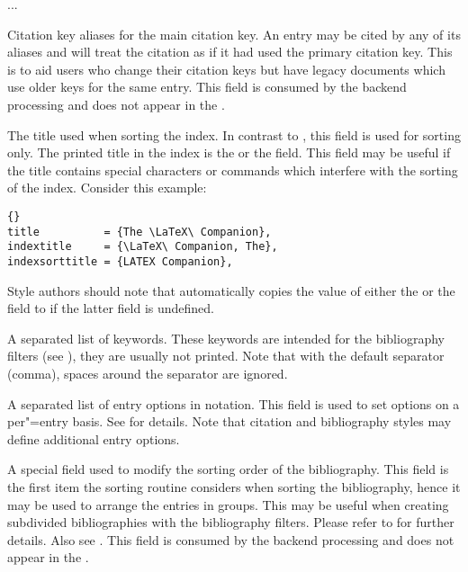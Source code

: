 \documentclass{ltxdockit}[2011/03/25]
\newcommand*{\biblatex}{\sty{biblatex}\xspace}
\begin{document}
\begin{fieldlist}
\begin{ltxexample}
\english[variant=british]
...
\endenglish
\end{ltxexample}
%


Citation key aliases for the main citation key. An entry may be cited by any of its aliases and \biblatex will treat the citation as if it had used the primary citation key. This is to aid users who change their citation keys but have legacy documents which use older keys for the same entry. This field is consumed by the backend processing and does not appear in the .


The title used when sorting the index. In contrast to , this field is used for sorting only. The printed title in the index is the  or the  field. This field may be useful if the title contains special characters or commands which interfere with the sorting of the index. Consider this example:

\begin{lstlisting}[style=bibtex]{}
title          = {The \LaTeX\ Companion},
indextitle     = {\LaTeX\ Companion, The},
indexsorttitle = {LATEX Companion},
\end{lstlisting}
%
Style authors should note that \biblatex automatically copies the value of either the  or the  field to  if the latter field is undefined.


A separated list of keywords. These keywords are intended for the bibliography filters (see ), they are usually not printed. Note that with the default separator (comma), spaces around the separator are ignored.


A separated list of entry options in \keyval notation. This field is used to set options on a per"=entry basis. See  for details. Note that citation and bibliography styles may define additional entry options.


A special field used to modify the sorting order of the bibliography. This field is the first item the sorting routine considers when sorting the bibliography, hence it may be used to arrange the entries in groups. This may be useful when creating subdivided bibliographies with the bibliography filters. Please refer to  for further details. Also see . This field is consumed by the backend processing and does not appear in the .


\end{fieldlist}
\end{document}
